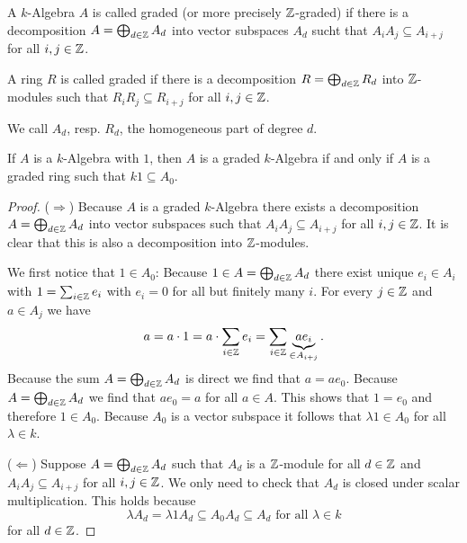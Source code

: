 \begin{defi}
 A $k$-Algebra $A$ is called graded (or more precisely $\mathbb{Z}$-graded) if there is a decomposition $A = \bigoplus_{d \in \mathbb{Z}} A_d$ into vector subspaces $A_d$ sucht that $A_i A_j \subseteq A_{i+j}$ for all $i,j \in \mathbb{Z}$.
 
 A ring $R$ is called graded if there is a decomposition $R = \bigoplus_{d \in \mathbb{Z}} R_d$ into $\mathbb{Z}$-modules such that $R_i R_j \subseteq R_{i+j}$ for all $i,j \in \mathbb{Z}$.
 
 We call $A_d$, resp. $R_d$, the homogeneous part of degree $d$.
\end{defi}

\begin{rem}
 If $A$ is a $k$-Algebra with $1$, then $A$ is a graded $k$-Algebra if and only if $A$ is a graded ring such that $k1 \subseteq A_0$.
\end{rem}
\begin{proof}
 ($\Rightarrow$) Because $A$ is a graded $k$-Algebra there exists a decomposition $A = \bigoplus_{d \in \mathbb{Z}} A_d$ into vector subspaces such that $A_i A_j \subseteq A_{i+j}$ for all $i,j \in \mathbb{Z}$. It is clear that this is also a decomposition into $\mathbb{Z}$-modules.
 
 We first notice that $1 \in A_0$: Because $1 \in A = \bigoplus_{d \in \mathbb{Z}} A_d$ there exist unique $e_i \in A_i$ with $1 = \sum_{i \in \mathbb{Z}} e_i$ with $e_i = 0$ for all but finitely many $i$. For every $j \in \mathbb{Z}$ and $a \in A_j$ we have
 \[
  a = a \cdot 1 = a \cdot \sum_{i \in \mathbb{Z}} e_i = \sum_{i \in \mathbb{Z}} \underbrace{a e_i}_{\in A_{i+j}}.
 \]
 Because the sum $A = \bigoplus_{d \in \mathbb{Z}} A_d$ is direct we find that $a = a e_0$. Because $A = \bigoplus_{d \in \mathbb{Z}} A_d$ we find that $a e_0 = a$ for all $a \in A$. This shows that $1 = e_0$ and therefore $1 \in A_0$. Because $A_0$ is a vector subspace it follows that $\lambda 1 \in A_0$ for all $\lambda \in k$.
 
 ($\Leftarrow$) Suppose $A = \bigoplus_{d \in \mathbb{Z}} A_d$ such that $A_d$ is a $\mathbb{Z}$-module for all $d \in \mathbb{Z}$ and $A_i A_j \subseteq A_{i+j}$ for all $i,j \in \mathbb{Z}$. We only need to check that $A_d$ is closed under scalar multiplication. This holds because
 \[
  \lambda A_d = \lambda 1 A_d \subseteq A_0 A_d \subseteq A_d \text{ for all } \lambda \in k
 \]
 for all $d \in \mathbb{Z}$.
\end{proof}


